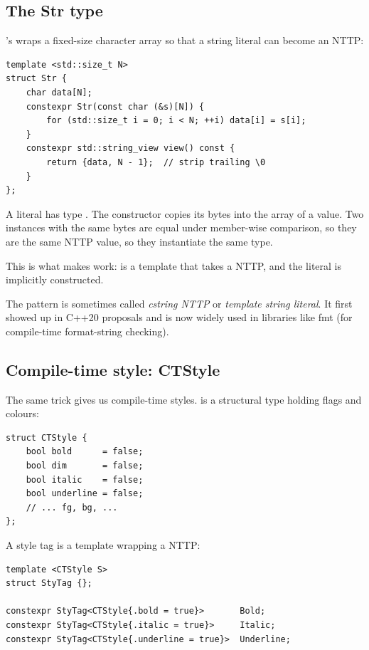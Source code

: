 \subsection*{The Str type}

\maya{}'s  wraps a fixed-size character array so that a
string literal can become an NTTP:

\begin{lstlisting}
template <std::size_t N>
struct Str {
    char data[N];
    constexpr Str(const char (&s)[N]) {
        for (std::size_t i = 0; i < N; ++i) data[i] = s[i];
    }
    constexpr std::string_view view() const {
        return {data, N - 1};  // strip trailing \0
    }
};
\end{lstlisting}

A literal  has type . The
constructor copies its bytes into the  array of a
 value. Two  instances with the same
bytes are equal under member-wise comparison, so they are the
same NTTP value, so they instantiate the same type.

This is what makes  work:  is a template
that takes a  NTTP, and the literal is implicitly
constructed.

\begin{funfact}
The  pattern is sometimes called \emph{cstring NTTP}
or \emph{template string literal}. It first showed up in C++20
proposals and is now widely used in libraries like fmt (for
compile-time format-string checking).
\end{funfact}

\subsection*{Compile-time style: CTStyle}

The same trick gives us compile-time styles.  is a
structural type holding flags and colours:

\begin{lstlisting}
struct CTStyle {
    bool bold      = false;
    bool dim       = false;
    bool italic    = false;
    bool underline = false;
    // ... fg, bg, ...
};
\end{lstlisting}

A style tag is a template wrapping a  NTTP:

\begin{lstlisting}
template <CTStyle S>
struct StyTag {};

constexpr StyTag<CTStyle{.bold = true}>       Bold;
constexpr StyTag<CTStyle{.italic = true}>     Italic;
constexpr StyTag<CTStyle{.underline = true}>  Underline;
\end{lstlisting}


